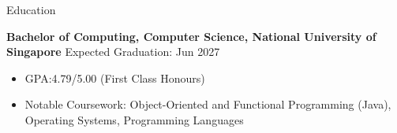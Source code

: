 \documentclass{phanuphat_srisukhawasu_resume} %
\begin{document}

%
%


\begin{rSection}{Education}

  \textbf{Bachelor of Computing, Computer Science, National University of Singapore} \hfill {Expected Graduation: Jun 2027}
  \begin{itemize}
    \item GPA:\@ 4.79/5.00 (First Class Honours)
    \item Notable Coursework: Object-Oriented and Functional Programming (Java), Operating Systems, Programming Languages
  \end{itemize}

\end{rSection}

\end{document}
